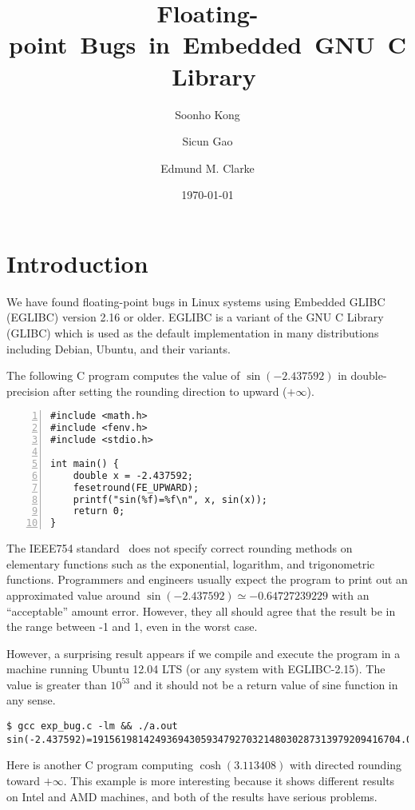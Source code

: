 \documentclass[12pt]{article}
\title{\mbox{Floating-point Bugs in Embedded GNU C Library}}
\author{Soonho Kong \and Sicun Gao \and Edmund M. Clarke}
\date{\today}
\begin{document}
\renewcommand*{\thepage}{title-\arabic{page}}
\maketitle
\renewcommand*{\thepage}{\arabic{page}}


\section{Introduction}\label{sec:intro}

We have found floating-point bugs in Linux systems using Embedded
GLIBC (EGLIBC) version 2.16 or older. EGLIBC is a variant of the GNU C
Library (GLIBC) which is used as the default implementation in many
distributions including Debian, Ubuntu, and their variants.

The following C program computes the value of $\sin(-2.437592)$ in
double-precision after setting the rounding direction to upward
($+\infty$).

\begin{Verbatim}[numbers=left, frame=single, fontsize=\relsize{-1}]
#include <math.h>
#include <fenv.h>
#include <stdio.h>

int main() {
    double x = -2.437592;
    fesetround(FE_UPWARD);
    printf("sin(%f)=%f\n", x, sin(x));
    return 0;
}
\end{Verbatim}

The IEEE754 standard~\cite{IEEE:1985:AIS} does not specify correct
rounding methods on elementary functions such as the exponential,
logarithm, and trigonometric functions. Programmers and engineers
usually expect the program to print out an approximated value around
$\sin(-2.437592) \simeq -0.64727239229$ with an ``acceptable'' amount
error. However, they all should agree that the result be in the range
between -1 and 1, even in the worst case.

However, a surprising result appears if we compile and execute the
program in a machine running Ubuntu 12.04 LTS (or any system with
EGLIBC-2.15). The value is greater than $10^{53}$ and it should not be
a return value of sine function in any sense.

\begin{Verbatim}[frame=single, fontsize=\relsize{-1}]
$ gcc exp_bug.c -lm && ./a.out
sin(-2.437592)=191561981424936943059347927032148030287313979209416704.00000
\end{Verbatim}

Here is another C program computing $\cosh(3.113408)$ with directed
rounding toward $+\infty$. This example is more interesting because it
shows different results on Intel and AMD machines, and both of the
results have serious problems.
\end{document}
